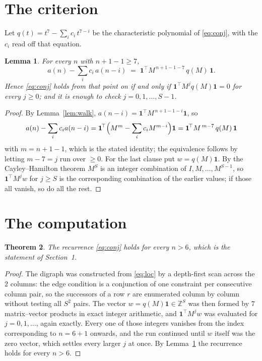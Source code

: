 \documentclass[11pt,a4paper]{article}
\theoremstyle{plain}
\newtheorem{theorem}{Theorem}
\newtheorem{lemma}[theorem]{Lemma}
\theoremstyle{definition}
\begin{document}
\section{The criterion}

Let $q(t)=t^{7}-\sum_i c_i\,t^{7-i}$ be the characteristic polynomial of
\eqref{eq:conj}, with the $c_i$ read off that equation.

\begin{lemma}\label{lem:crit}
For every $n$ with $n+1-1\ge7$,
\[
a(n)-\sum_i c_i\,a(n-i)\;=\;\mathbf{1}^{\!\top}M^{\,n+1-1-7}\,q(M)\,\mathbf{1} .
\]
Hence \eqref{eq:conj} holds from that point on if and only if
$\mathbf{1}^{\!\top}M^{j}q(M)\mathbf{1}=0$ for every $j\ge0$; and it is enough to check
$j=0,1,\dots,S-1$.
\end{lemma}

\begin{proof}
By Lemma~\ref{lem:walk}, $a(n-i)=\mathbf{1}^{\!\top}M^{\,n+1-1-i}\mathbf{1}$, so
\[
a(n)-\sum_i c_i a(n-i)
=\mathbf{1}^{\!\top}\Bigl(M^{m}-\sum_i c_i M^{m-i}\Bigr)\mathbf{1}
=\mathbf{1}^{\!\top}M^{\,m-7}\,q(M)\,\mathbf{1}
\]
with $m=n+1-1$, which is the stated identity; the equivalence follows by letting
$m-7=j$ run over $\ge0$. For the last clause put $w=q(M)\mathbf{1}$. By the
Cayley--Hamilton theorem $M^{S}$ is an integer combination of $I,M,\dots,M^{S-1}$, so
$\mathbf{1}^{\!\top}M^{j}w$ for $j\ge S$ is the corresponding combination of the earlier
values; if those all vanish, so do all the rest.
\end{proof}

\section{The computation}

\begin{theorem}
The recurrence \eqref{eq:conj} holds for every $n>6$, which is the statement of
Section~1.
\end{theorem}

\begin{proof}
The digraph was constructed from \eqref{eq:loc} by a depth-first scan across the $2$
columns: the edge condition is a conjunction of one constraint per consecutive column
pair, so the successors of a row $r$ are enumerated column by column without testing all
$S^2$ pairs. The vector $w=q(M)\mathbf{1}\in\mathbb{Z}^{S}$ was then formed by $7$
matrix--vector products in exact integer arithmetic, and $\mathbf{1}^{\!\top}M^{j}w$ was
evaluated for $j=0,1,\dots$, again exactly. Every one of those integers vanishes from the
index corresponding to $n=6+1$ onwards, and the run continued until $w$ itself was the
zero vector, which settles every larger $j$ at once. By Lemma~\ref{lem:crit} the recurrence
holds for every $n>6$.
\end{proof}
\end{document}
